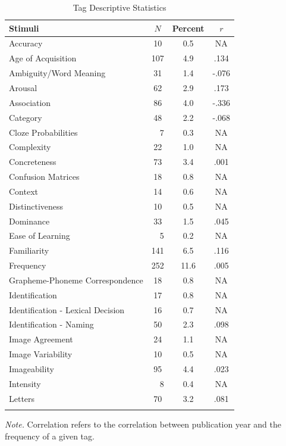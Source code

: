 \documentclass[english,,man]{apa6}
\theoremstyle{definition}
\theoremstyle{definition}
\theoremstyle{definition}
\theoremstyle{remark}
\begin{document}
\begin{table}[tbp]
\begin{center}
\begin{threeparttable}
\caption{\label{tab:tag-table}Tag Descriptive Statistics}
\small{
\begin{tabular}{lccc}
\toprule
Stimuli & $N$ & Percent & $r$\\
\midrule
Accuracy & 10 & 0.5 & NA\\
Age of Acquisition & 107 & 4.9 & .134\\
Ambiguity/Word Meaning & 31 & 1.4 & -.076\\
Arousal & 62 & 2.9 & .173\\
Association & 86 & 4.0 & -.336\\
Category & 48 & 2.2 & -.068\\
Cloze Probabilities & \ \ 7 & 0.3 & NA\\
Complexity & 22 & 1.0 & NA\\
Concreteness & 73 & 3.4 & .001\\
Confusion Matrices & 18 & 0.8 & NA\\
Context & 14 & 0.6 & NA\\
Distinctiveness & 10 & 0.5 & NA\\
Dominance & 33 & 1.5 & .045\\
Ease of Learning & \ \ 5 & 0.2 & NA\\
Familiarity & 141 & 6.5 & .116\\
Frequency & 252 & 11.6 & .005\\
Grapheme-Phoneme Correspondence & 18 & 0.8 & NA\\
Identification & 17 & 0.8 & NA\\
Identification - Lexical Decision & 16 & 0.7 & NA\\
Identification - Naming & 50 & 2.3 & .098\\
Image Agreement & 24 & 1.1 & NA\\
Image Variability & 10 & 0.5 & NA\\
Imageability & 95 & 4.4 & .023\\
Intensity & \ \ 8 & 0.4 & NA\\
Letters & 70 & 3.2 & .081\\
\bottomrule
\addlinespace
\end{tabular}
}
\begin{tablenotes}[para]
\normalsize{\textit{Note.} Correlation refers to the correlation between publication year and the frequency of a given tag.}
\end{tablenotes}
\end{threeparttable}
\end{center}
\end{table}
\end{document}
